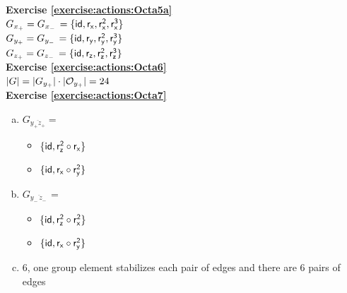 \noindent\textbf{Exercise \ref{exercise:actions:Octa5a}}
\\
\bigskip
$G_{x_+} = G_{x_-\,} = \{\sf{id}, r_x, r_x^2, r_x^3\}$
\\
\bigskip
$G_{y_+} = G_{y_-\,} = \{\sf{id}, r_y, r_y^2, r_y^3\}$
\\
$G_{z_+} = G_{z_-\,} = \{\sf{id}, r_z, r_z^2, r_z^3\}$
\\

\noindent\textbf{Exercise \ref{exercise:actions:Octa6}}
\\
$|G| = | G_{y_+}| \cdot |{\cal O}_{y_+}| = 24$
\\

\noindent\textbf{Exercise \ref{exercise:actions:Octa7}}
\begin{enumerate}[(a)]
\item
$G_{\overline{y_+z_+}} =$
	\begin{itemize}
	\item
	$\{\sf{id}, r_z^2 \circ r_x\}$
	
	\item
	$\{\sf{id}, r_x \circ r_y^2\}$
	\end{itemize}
	
\item
$G_{\overline{y_-\,z_-\,}} =$
	\begin{itemize}
	\item
	$\{\sf{id}, r_z^2 \circ r_x^2\}$
	
	\item
	$\{\sf{id}, r_x \circ r_y^2\}$
	\end{itemize}
	
\item
6, one group element stabilizes each pair of edges and there are 6 pairs of edges
\end{enumerate}

